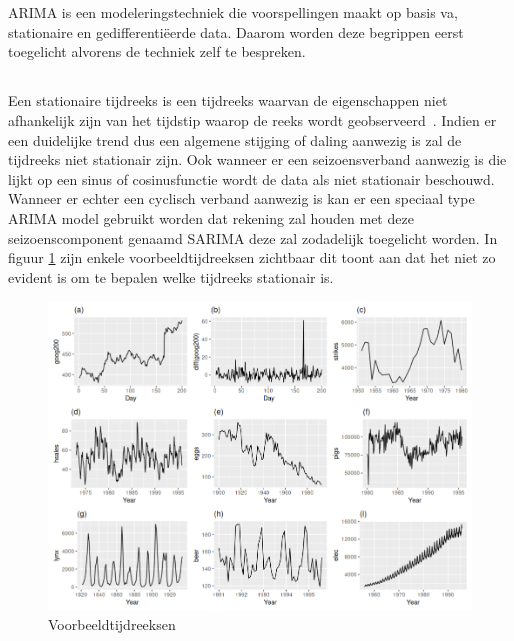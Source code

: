 \section{}
\label{sec: Theoretische toelichting over ARIMA}

ARIMA is een modeleringstechniek die voorspellingen maakt op basis va, stationaire en gedifferenti\"{e}erde data. Daarom worden deze begrippen eerst toegelicht alvorens de techniek zelf te bespreken. 

\subsection{}

Een stationaire tijdreeks is een tijdreeks waarvan de eigenschappen niet afhankelijk zijn van het tijdstip waarop de reeks wordt geobserveerd~\autocite{Hyndman2018}. Indien er een duidelijke trend dus een algemene stijging of daling aanwezig is zal de tijdreeks niet stationair zijn. Ook wanneer er een seizoensverband aanwezig is die lijkt op een sinus of cosinusfunctie wordt de data als niet stationair beschouwd. Wanneer er echter een cyclisch verband aanwezig is kan er een speciaal type ARIMA model gebruikt worden dat rekening zal houden met deze seizoenscomponent genaamd SARIMA deze zal zodadelijk toegelicht worden.
In figuur \ref{fig:stationarity} zijn enkele voorbeeldtijdreeksen zichtbaar dit toont aan dat het niet zo evident is om te bepalen welke tijdreeks stationair is.

\begin{figure}[!h]
    \centering
    \caption{Voorbeeldtijdreeksen~\autocite{Hyndman2018}}
    \label{fig:stationarity}
    \includegraphics[width=0.7\linewidth]{stationarity}
\end{figure}


